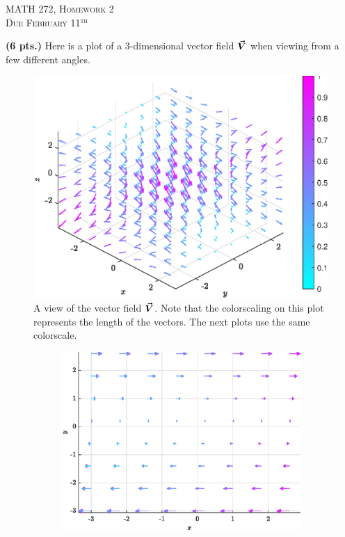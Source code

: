 \documentclass[12pt]{article} %
\begin{document}
\begin{center}
   \textsc{\large MATH 272, Homework 2}\\
   \textsc{Due February 11$^\textrm{th}$}
\end{center}
\vspace{.5cm}


\begin{problem}
\textbf{(6 pts.)} Here is a plot of a 3-dimensional vector field $\boldsymbol{\vec{V}}$ when viewing from a few different angles.
\begin{figure}[H]
    \centering
    \includegraphics[width=.85\textwidth]{figures/vecfield}
    \caption{A view of the vector field $\boldsymbol{\vec{V}}$. Note that the colorscaling on this plot represents the length of the vectors. The next plots use the same colorscale.}
\end{figure}
\begin{figure}[H]
    \centering
    \begin{subfigure}[b]{0.45\textwidth}
        \centering
        \includegraphics[width=\textwidth]{figures/vecfield_xy}

\end{subfigure}
\end{figure}
\end{problem}
\end{document}
